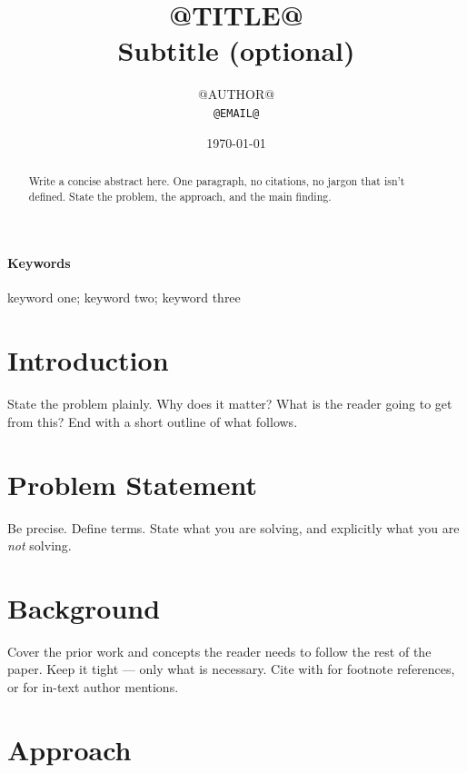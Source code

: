\documentclass[12pt,a4paper]{article}
\title{%
  @TITLE@%
  \\ \large Subtitle (optional)%
}
\author{%
  @AUTHOR@\\
  \small\texttt{@EMAIL@}
}
\date{\today}
\begin{document}
\maketitle
\thispagestyle{fancy}

\begin{abstract}
Write a concise abstract here. One paragraph, no citations,
no jargon that isn't defined. State the problem, the approach,
and the main finding.
\end{abstract}

\paragraph{Keywords} keyword one; keyword two; keyword three


\section{Introduction}

State the problem plainly. Why does it matter? What is the
reader going to get from this? End with a short outline
of what follows.

\section{Problem Statement}

Be precise. Define terms. State what you are solving, and
explicitly what you are \emph{not} solving.

\section{Background}

Cover the prior work and concepts the reader needs to follow
the rest of the paper. Keep it tight --- only what is necessary.
Cite with \autocite{} for footnote references, or
\textcite{} for in-text author mentions.

\section{Approach}
\end{document}
